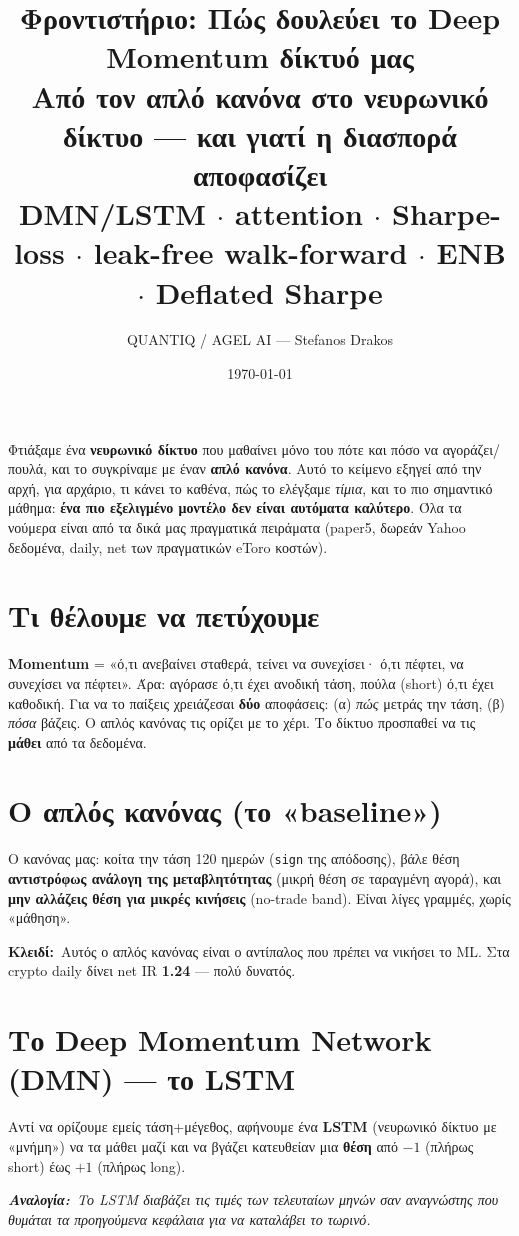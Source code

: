 \documentclass[11pt]{article}
\title{\textbf{Φροντιστήριο: Πώς δουλεύει το Deep Momentum δίκτυό μας}\\[3pt]
\large Από τον απλό κανόνα στο νευρωνικό δίκτυο --- και γιατί η διασπορά αποφασίζει\\[-1pt]
\normalsize\textcolor{accent}{DMN/LSTM $\cdot$ attention $\cdot$ Sharpe-loss $\cdot$ leak-free walk-forward $\cdot$ ENB $\cdot$ Deflated Sharpe}}
\author{QUANTIQ / AGEL AI --- Stefanos Drakos}\date{\today}
\newcommand{\key}[1]{\par\medskip\noindent\colorbox{soft}{\parbox{\dimexpr\linewidth-2\fboxsep}{\textcolor{accent}{\textbf{Κλειδί:}}\ #1}}\par\medskip}
\newcommand{\analogy}[1]{\par\smallskip\noindent\textit{\textbf{Αναλογία:}\ #1}\par\smallskip}
\begin{document}
\maketitle\thispagestyle{empty}

\noindent Φτιάξαμε ένα \textbf{νευρωνικό δίκτυο} που μαθαίνει μόνο του πότε και πόσο να αγοράζει/πουλά,
και το συγκρίναμε με έναν \textbf{απλό κανόνα}. Αυτό το κείμενο εξηγεί από την αρχή, για αρχάριο, τι
κάνει το καθένα, πώς το ελέγξαμε \emph{τίμια}, και το πιο σημαντικό μάθημα: \textbf{ένα πιο εξελιγμένο
μοντέλο δεν είναι αυτόματα καλύτερο}. Όλα τα νούμερα είναι από τα δικά μας πραγματικά πειράματα
(paper5, δωρεάν Yahoo δεδομένα, daily, net των πραγματικών eToro κοστών).

\tableofcontents
\bigskip

\section{Τι θέλουμε να πετύχουμε}
\textbf{Momentum} = «ό,τι ανεβαίνει σταθερά, τείνει να συνεχίσει· ό,τι πέφτει, να συνεχίσει να πέφτει».
Άρα: αγόρασε ό,τι έχει ανοδική τάση, πούλα (short) ό,τι έχει καθοδική. Για να το παίξεις χρειάζεσαι
\textbf{δύο} αποφάσεις: (α) \emph{πώς} μετράς την τάση, (β) \emph{πόσα} βάζεις. Ο απλός κανόνας τις
ορίζει με το χέρι. Το δίκτυο προσπαθεί να τις \textbf{μάθει} από τα δεδομένα.

\section{Ο απλός κανόνας (το «baseline»)}
Ο κανόνας μας: κοίτα την τάση 120 ημερών (\texttt{sign} της απόδοσης), βάλε θέση \textbf{αντιστρόφως
ανάλογη της μεταβλητότητας} (μικρή θέση σε ταραγμένη αγορά), και \textbf{μην αλλάζεις θέση για μικρές
κινήσεις} (no-trade band). Είναι λίγες γραμμές, χωρίς «μάθηση».
\key{Αυτός ο απλός κανόνας είναι ο αντίπαλος που πρέπει να νικήσει το ML. Στα crypto daily δίνει net
IR \textbf{1.24} --- πολύ δυνατός.}

\section{Το Deep Momentum Network (DMN) --- το LSTM}
Αντί να ορίζουμε εμείς τάση+μέγεθος, αφήνουμε ένα \textbf{LSTM} (νευρωνικό δίκτυο με «μνήμη») να τα
μάθει μαζί και να βγάζει κατευθείαν μια \textbf{θέση} από $-1$ (πλήρως short) έως $+1$ (πλήρως long).
\analogy{Το LSTM διαβάζει τις τιμές των τελευταίων μηνών σαν αναγνώστης που θυμάται τα προηγούμενα
κεφάλαια για να καταλάβει το τωρινό.}
\end{document}
